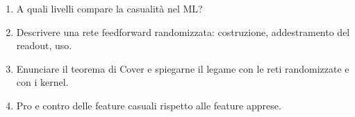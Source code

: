 \begin{domande}
\begin{enumerate}
  \item A quali livelli compare la casualità nel ML?
  \item Descrivere una rete feedforward randomizzata: costruzione, addestramento del readout, uso.
  \item Enunciare il teorema di Cover e spiegarne il legame con le reti randomizzate e con i kernel.
  \item Pro e contro delle feature casuali rispetto alle feature apprese.
\end{enumerate}
\end{domande}
